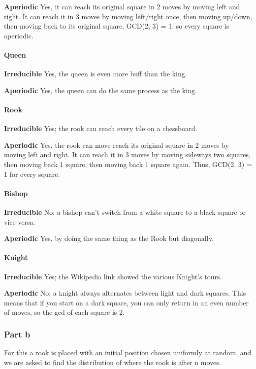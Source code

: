 \documentclass{article}
\begin{document}
\textbf{Aperiodic}
Yes, it can reach its original square in 2 moves by moving left and right. It can reach it in 3 moves by moving left/right once, then moving up/down, then moving back to its original square. GCD(2, 3) = 1, so every square is aperiodic.

\paragraph{Queen\\}
\textbf{Irreducible}
Yes, the queen is even more buff than the king.

\textbf{Aperiodic}
Yes, the queen can do the same process as the king.

\paragraph{Rook\\}
\textbf{Irreducible}
Yes; the rook can reach every tile on a chessboard.

\textbf{Aperiodic}
Yes, the rook can move reach its original square in 2 moves by moving left and right. It can reach it in 3 moves by moving sideways two squares, then moving back 1 square, then moving back 1 square again. Thus, GCD(2, 3) = 1 for every square.

\paragraph{Bishop\\}
\textbf{Irreducible}
No; a bishop can't switch from a white square to a black square or vice-versa.

\textbf{Aperiodic}
Yes, by doing the same thing as the Rook but diagonally.

\paragraph{Knight\\}
\textbf{Irreducible}
Yes; the Wikipedia link showed the various Knight's tours.

\textbf{Aperiodic}
No; a knight always alternates between light and dark squares. This means that if you start on a dark square, you can only return in an even number of moves, so the gcd of each square is 2. 

\subsubsection{Part b}
For this a rook is placed with an initial position chosen uniformly at random, and we are asked to find the distribution of where the rook is after n moves.
\end{document}
